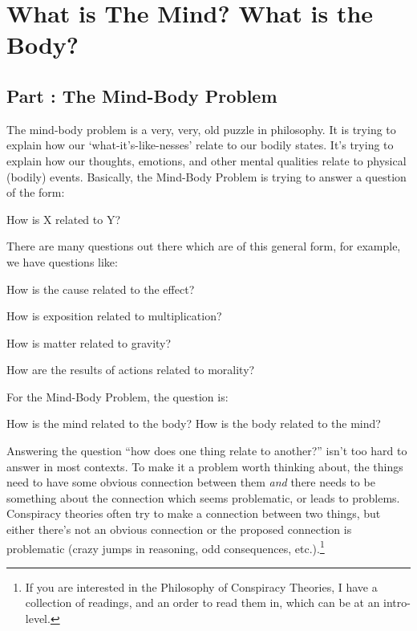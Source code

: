 \part{What is The Mind? What is the Body?}
\label{ch.modthree}

\chapter{Part \thechapcount: The Mind-Body Problem}\setcounter{seccount}{1}
The mind-body problem is a very, very, old puzzle in philosophy. It is trying to explain how our `what-it's-like-nesses' relate to our bodily states. It's trying to explain how our thoughts, emotions, and other mental qualities relate to physical (bodily) events. Basically, the Mind-Body Problem is trying to answer a question of the form:

\begin{center}How is X related to Y?\end{center}

There are many questions out there which are of this general form, for example, we have questions like:
\begin{earg}
    \item[]How is the cause related to the effect?
    \item[]How is exposition related to multiplication?
    \item[]How is matter related to gravity?
    \item[]How are the results of actions related to morality?
\end{earg}
For the Mind-Body Problem, the question is:

\begin{center}How is the mind related to the body?
How is the body related to the mind?\end{center}

Answering the question “how does one thing relate to another?” isn’t too hard to answer in most contexts. To make it a problem worth thinking about, the things need to have some obvious connection between them \emph{and} there needs to be something about the connection which seems problematic, or leads to problems. Conspiracy theories often try to make a connection between two things, but either there’s not an obvious connection or the proposed connection is problematic (crazy jumps in reasoning, odd consequences, etc.).\footnote{If you are interested in the Philosophy of Conspiracy Theories, I have a collection of readings, and an order to read them in, which can be at an intro-level.}

